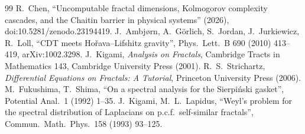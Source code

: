 \documentclass[11pt]{article}
\theoremstyle{remark}\newtheorem*{remark}{Remark}
\begin{document}
\begin{thebibliography}{99}
 R.~Chen, ``Uncomputable fractal dimensions, Kolmogorov complexity cascades, and the Chaitin barrier in physical systems'' (2026), doi:10.5281/zenodo.23194419.
 J.~Ambj{\o}rn, A.~G{\"o}rlich, S.~Jordan, J.~Jurkiewicz, R.~Loll, ``CDT meets Ho\v{r}ava--Lifshitz gravity'', Phys.\ Lett.\ B 690 (2010) 413--419, arXiv:1002.3298.
 J.~Kigami, \emph{Analysis on Fractals}, Cambridge Tracts in Mathematics 143, Cambridge University Press (2001).
 R.~S.~Strichartz, \emph{Differential Equations on Fractals: A Tutorial}, Princeton University Press (2006).
 M.~Fukushima, T.~Shima, ``On a spectral analysis for the Sierpi\'nski gasket'', Potential Anal.\ 1 (1992) 1--35.
 J.~Kigami, M.~L.~Lapidus, ``Weyl's problem for the spectral distribution of Laplacians on p.c.f.\ self-similar fractals'', Commun.\ Math.\ Phys.\ 158 (1993) 93--125.
\end{thebibliography}
\end{document}
